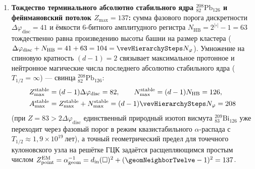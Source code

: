 \begin{theorem}
\begin{enumerate}[leftmargin=*]
  Продолжение верхней ветви~\eqref{eq:chem-nuclear-magic-polynomials} на следующий иерархический индекс $k = \vevHierarchySteps = |\triangle| = 8$ предсказывает магическое число нейтронов центра сверхтяжёлого «острова стабильности»:
  \begin{equation}
  \label{eq:chem-island-of-stability-184}
    N_{\mathrm{island}} = M_{\mathrm{magic}}^{(\mathrm{high})}(\vevHierarchySteps) = \frac{\vevHierarchySteps\bigl(\vevHierarchySteps^2 + d_{\mathrm{out}}(E)\bigr)}{d} = \frac{8(64 + 5)}{3} = 184,
  \end{equation}
  тогда как в заряженном протонном регистре кулоновское отталкивание на 12-лучевой звезде ($\geomNeighborTwelve=12$) и 6 квадратных гранях ($|\square|=6$) сдвигает протонное замыкание со $126$ вниз в полосу $Z_{\mathrm{island}} \in \{126 - \geomNeighborTwelve,\; 126 - |\square|\} = \{114,\; 120\}$ (дважды магический флеровий $^{298}_{114}\text{Fl}_{184}$).
\item \textbf{Тождество терминального абсолютно стабильного ядра $^{208}_{82}\text{Pb}_{126}$ и фейнмановский потолок $Z_{\max}=137$:}
  сумма фазового порога дискретности $\Delta\varphi_{\mathrm{disc}} = 41$ и ёмкости 6-битного амплитудного регистра $N_{\mathrm{HB}} = 2^{|\square|} - 1 = 63$ тождественно равна произведению высоты башни на размер кластера ($\Delta\varphi_{\mathrm{disc}} + N_{\mathrm{HB}} = 41 + 63 = 104 = \vevHierarchySteps N_\varphi$).
  Умножение на спиновую кратность $(d-1)=2$ связывает максимальное протонное и нейтронное магические числа последнего абсолютно стабильного ядра ($T_{1/2}=\infty$) — свинца $^{208}_{82}\text{Pb}_{126}$:
  \begin{equation}
  \label{eq:chem-lead208-terminal-identity}
  \begin{aligned}
    Z_{\max}^{\mathrm{stable}} &= (d-1)\Delta\varphi_{\mathrm{disc}} = 82,\qquad
    N_{\max}^{\mathrm{stable}} = (d-1)N_{\mathrm{HB}} = 126,\\
    A_{\max}^{\mathrm{stable}} &= Z_{\max}^{\mathrm{stable}} + N_{\max}^{\mathrm{stable}} = (d-1)\vevHierarchySteps N_\varphi = 208
  \end{aligned}
  \end{equation}
  (при $Z = 83 > 2\Delta\varphi_{\mathrm{disc}}$ единственный природный изотоп висмута $^{209}_{83}\text{Bi}_{126}$ уже переходит через фазовый порог в режим квазистабильного $\alpha$-распада с $T_{1/2}\approx 1{,}9\times 10^{19}\ \text{лет}$), а точный геометрический предел для точечного кулоновского узла на решётке ГЦК задаётся расщепляющимся простым числом $Z_{\mathrm{point}}^{\mathrm{EM}} = \alpha_{\mathrm{geom}}^{-1} = d_{\mathrm{in}}(\square)^2 + (\geomNeighborTwelve - 1)^2 = 137$.
\end{enumerate}
\end{theorem}


